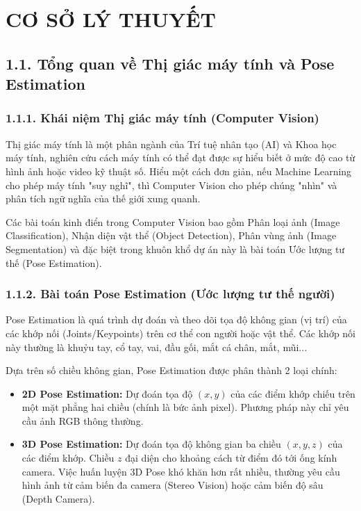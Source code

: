 \documentclass[12pt,a4paper]{report}
\begin{document}
\chapter{CƠ SỞ LÝ THUYẾT}

\section{1.1. Tổng quan về Thị giác máy tính và Pose Estimation}
\subsection{1.1.1. Khái niệm Thị giác máy tính (Computer Vision)}
Thị giác máy tính là một phân ngành của Trí tuệ nhân tạo (AI) và Khoa học máy tính, nghiên cứu cách máy tính có thể đạt được sự hiểu biết ở mức độ cao từ hình ảnh hoặc video kỹ thuật số. Hiểu một cách đơn giản, nếu Machine Learning cho phép máy tính "suy nghĩ", thì Computer Vision cho phép chúng "nhìn" và phân tích ngữ nghĩa của thế giới xung quanh. 

Các bài toán kinh điển trong Computer Vision bao gồm Phân loại ảnh (Image Classification), Nhận diện vật thể (Object Detection), Phân vùng ảnh (Image Segmentation) và đặc biệt trong khuôn khổ dự án này là bài toán Ước lượng tư thế (Pose Estimation).

\subsection{1.1.2. Bài toán Pose Estimation (Ước lượng tư thế người)}
Pose Estimation là quá trình dự đoán và theo dõi tọa độ không gian (vị trí) của các khớp nối (Joints/Keypoints) trên cơ thể con người hoặc vật thể. Các khớp nối này thường là khuỷu tay, cổ tay, vai, đầu gối, mắt cá chân, mắt, mũi...

Dựa trên số chiều không gian, Pose Estimation được phân thành 2 loại chính:
\begin{itemize}
    \item \textbf{2D Pose Estimation:} Dự đoán tọa độ $(x, y)$ của các điểm khớp chiếu trên một mặt phẳng hai chiều (chính là bức ảnh pixel). Phương pháp này chỉ yêu cầu ảnh RGB thông thường.
    \item \textbf{3D Pose Estimation:} Dự đoán tọa độ không gian ba chiều $(x, y, z)$ của các điểm khớp. Chiều $z$ đại diện cho khoảng cách từ điểm đó tới ống kính camera. Việc huấn luyện 3D Pose khó khăn hơn rất nhiều, thường yêu cầu hình ảnh từ cảm biến đa camera (Stereo Vision) hoặc cảm biến độ sâu (Depth Camera).
\end{itemize}
\end{document}
